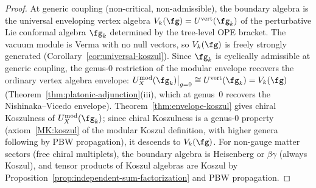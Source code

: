 \begin{proof}
At generic coupling \textup{(}non-critical,
non-admissible\textup{)}, the boundary algebra is
the universal enveloping vertex algebra
$V_k(\fg) = U^{\mathrm{vert}}(\fg_k)$ of the
perturbative Lie conformal algebra $\fg_k$
determined by the tree-level OPE bracket.  The
vacuum module is Verma with no null vectors, so
$V_k(\fg)$ is freely strongly generated
\textup{(}Corollary~\textup{\ref{cor:universal-koszul}}\textup{)}.
Since $\fg_k$ is cyclically admissible at generic
coupling, the genus-$0$ restriction of the modular
envelope recovers the ordinary vertex algebra
envelope: $U_X^{\mathrm{mod}}(\fg_k)\big|_{g=0}
\cong U^{\mathrm{vert}}(\fg_k) = V_k(\fg)$
\textup{(}Theorem~\textup{\ref{thm:platonic-adjunction}(iii)},
which at genus~$0$ recovers the Nishinaka--Vicedo
envelope\textup{)}.
Theorem~\textup{\ref{thm:envelope-koszul}} gives
chiral Koszulness of $U_X^{\mathrm{mod}}(\fg_k)$;
since chiral Koszulness is a genus-$0$ property
\textup{(}axiom~\textup{\ref{MK:koszul}} of the
modular Koszul definition, with higher genera
following by PBW propagation\textup{)}, it descends
to $V_k(\fg)$.
For non-gauge matter sectors
\textup{(}free chiral multiplets\textup{)},
the boundary algebra is Heisenberg or $\beta\gamma$
\textup{(}always Koszul\textup{)}, and tensor products of
Koszul algebras are Koszul by
Proposition~\textup{\ref{prop:independent-sum-factorization}}
and PBW propagation.
\end{proof}


